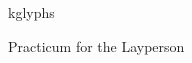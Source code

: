 \documentclass{article}
\begin{document}
\centerline{\sc \large kglyphs}
\centerline{\sc Practicum for the Layperson }
\end{document}
